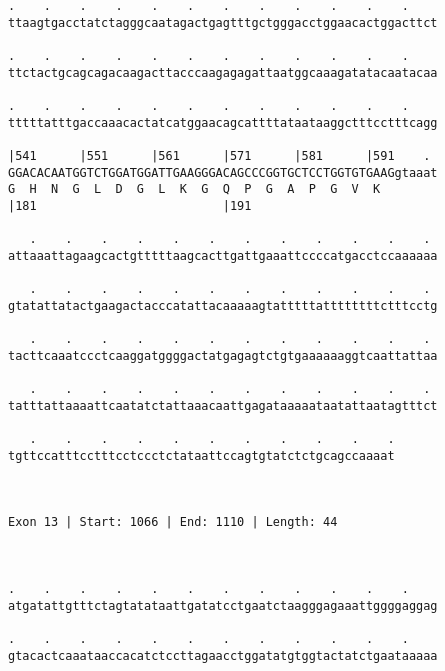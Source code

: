 \documentclass{article}
\begin{document}
\begin{Verbatim}
.    .    .    .    .    .    .    .    .    .    .    .    
ttaagtgacctatctagggcaatagactgagtttgctgggacctggaacactggacttct
                                                            
.    .    .    .    .    .    .    .    .    .    .    .    
ttctactgcagcagacaagacttacccaagagagattaatggcaaagatatacaatacaa
                                                            
.    .    .    .    .    .    .    .    .    .    .    .    
tttttatttgaccaaacactatcatggaacagcattttataataaggctttcctttcagg
                                                            
|541      |551      |561      |571      |581      |591    . 
GGACACAATGGTCTGGATGGATTGAAGGGACAGCCCGGTGCTCCTGGTGTGAAGgtaaat
G  H  N  G  L  D  G  L  K  G  Q  P  G  A  P  G  V  K        
|181                          |191                          
  
   .    .    .    .    .    .    .    .    .    .    .    . 
attaaattagaagcactgtttttaagcacttgattgaaattccccatgacctccaaaaaa
                                                            
   .    .    .    .    .    .    .    .    .    .    .    . 
gtatattatactgaagactacccatattacaaaaagtatttttattttttttctttcctg
                                                            
   .    .    .    .    .    .    .    .    .    .    .    . 
tacttcaaatccctcaaggatggggactatgagagtctgtgaaaaaaggtcaattattaa
                                                            
   .    .    .    .    .    .    .    .    .    .    .    . 
tatttattaaaattcaatatctattaaacaattgagataaaaataatattaatagtttct
                                                            
   .    .    .    .    .    .    .    .    .    .    .
tgttccatttcctttcctccctctataattccagtgtatctctgcagccaaaat
                                                      
                                                      
 
Exon 13 | Start: 1066 | End: 1110 | Length: 44



.    .    .    .    .    .    .    .    .    .    .    .    
atgatattgtttctagtatataattgatatcctgaatctaagggagaaattggggaggag
                                                            
.    .    .    .    .    .    .    .    .    .    .    .    
gtacactcaaataaccacatctccttagaacctggatatgtggtactatctgaataaaaa
                                                            

\end{Verbatim}
\end{document}
